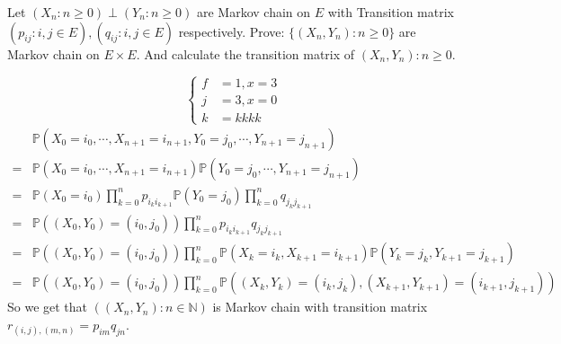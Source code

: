 \documentclass{ctexart}
\newif\ifpreface
\begin{document}
\large
\setlength{\baselineskip}{1.2em}
\ifpreface
  
\else
\fi
{}
\allowdisplaybreaks[4]
\begin{problem}\label{pro:1}
  Let \((X_n:n \geq 0)\perp (Y_n: n \geq 0)\) are Markov chain on \(E\) with
  Transition matrix \((p_{ij}:i,j \in E),(q_{ij}:i,j \in E)\) respectively.
  Prove: \(\{(X_n,Y_n):n \geq 0\}\) are Markov chain on \(E \times E\).
  And calculate the transition matrix of \((X_n,Y_n):n \geq 0\).
\end{problem}
\begin{solution}
  \[
    \begin{cases}
      f & =1,x=3  \\
      j & = 3,x=0 \\
      k & =kkkk
    \end{cases}
  \]
  \[
    \begin{aligned}
       & \mathbb{P}(X_0=i_0,\cdots,X_{n+1} =i_{n+1},Y_0=j_0,\cdots,Y_{n+1}=j_{n+1})
      \\= & \mathbb{P}(X_0=i_0,\cdots,X_{n+1} =i_{n+1})\mathbb{P}(Y_0=j_0,\cdots,Y_{n+1}=j_{n+1})
      \\= & \mathbb{P}(X_0=i_0)\prod_{k=0}^{n} p_{i_k i_{k+1} } \mathbb{P}(Y_0=j_0) \prod_{k=0}^{n} q_{j_k j_{k+1}}
      \\= & \mathbb{P}((X_0,Y_0)=(i_0,j_0)) \prod_{k=0}^{n} p_{i_k i_{k+1} } q_{j_k j_{k+1}}
      \\= & \mathbb{P}((X_0,Y_0)=(i_0,j_0)) \prod_{k=0}^{n} \mathbb{P}(X_k = i_k,X_{k + 1}=i_{k + 1})\mathbb{P}(Y_k=j_k,Y_{k + 1}=j_{k + 1})
      \\=& \mathbb{P}((X_0,Y_0)=(i_0,j_0)) \prod_{k=0}^{n} \mathbb{P}((X_k,Y_{k})=(i_k,j_{k}),(X_{k + 1},Y_{k + 1})=(i_{k + 1},j_{k + 1}))
    \end{aligned}
  \]
  So we get that \(\left((X_n,Y_n): n \in \mathbb{N}\right)\) is Markov chain with transition matrix
  \(r_{(i,j),(m,n)}=p_{im}q_{jn}\).
\end{solution}
\end{document}
